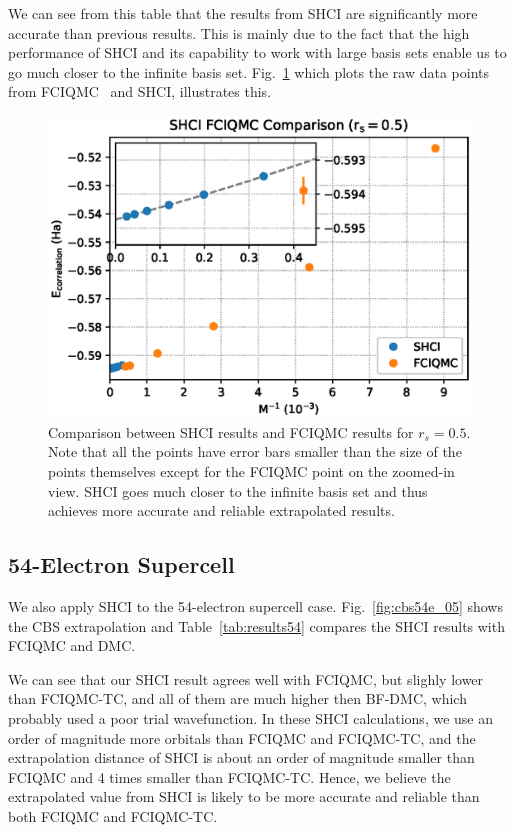 \documentclass[%
reprint,
 superscriptaddress,
 amsmath,amssymb,
 aps,
]{revtex4-1}
\begin{document}
We can see from this table that the results from SHCI are significantly more accurate than previous results.
This is mainly due to the fact that the high performance of SHCI and its capability to work with large basis sets enable us to go much closer to the infinite basis set. Fig.~\ref{fig:comparison} which plots the raw data points from FCIQMC~\cite{shepherd2012full} and SHCI, illustrates this.
\begin{figure}
  \begin{center}
  \includegraphics[width=\linewidth]{figs/compare.eps}
  \end{center}
  \vspace{-0.2cm}
  \caption{Comparison between SHCI results and FCIQMC results for $r_s=0.5$.
  Note that all the points have error bars smaller than the size of the points themselves except for the FCIQMC point on the zoomed-in view.
  SHCI goes much closer to the infinite basis set and thus achieves more accurate and reliable extrapolated results.
  }
  \label{fig:comparison}
\end{figure}

\subsection{54-Electron Supercell}
We also apply SHCI to the 54-electron supercell case.
Fig.~\ref{fig:cbs54e_05} shows the CBS extrapolation and Table~\ref{tab:results54} compares the SHCI results with FCIQMC and DMC.

We can see that our SHCI result agrees well with FCIQMC, but slighly lower than FCIQMC-TC, and all of them are much higher then BF-DMC, which probably used a poor trial wavefunction.
In these SHCI calculations, we use an order of magnitude more orbitals than FCIQMC and FCIQMC-TC, and the extrapolation distance of SHCI is about an order of magnitude smaller than FCIQMC and 4 times smaller than FCIQMC-TC.
Hence, we believe the extrapolated value from SHCI is likely to be more accurate and reliable than both FCIQMC and FCIQMC-TC.
\end{document}
